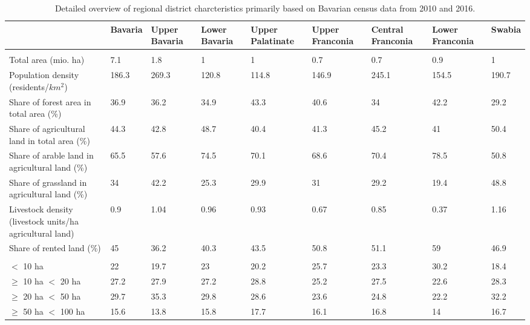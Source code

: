 \begin{table}

\caption{\label{tab:description_districts}Detailed overview of regional district charcteristics 
              primarily based on Bavarian census data from 2010 and 2016.}
\centering
\fontsize{10}{12}\selectfont
\begin{tabu} to 
\toprule
  & Bavaria & Upper
Bavaria & Lower
Bavaria & Upper
Palatinate & Upper
Franconia & Central
Franconia & Lower
Franconia & Swabia\\
\midrule
\addlinespace[0.3em]
\\
Total area (mio. ha) & 7.1 & 1.8 & 1 & 1 & 0.7 & 0.7 & 0.9 & 1\\
Population density (residents/$km^2$) & 186.3 & 269.3 & 120.8 & 114.8 & 146.9 & 245.1 & 154.5 & 190.7\\
Share of forest area in total area (\%) & 36.9 & 36.2 & 34.9 & 43.3 & 40.6 & 34 & 42.2 & 29.2\\
Share of agricultural land in total area (\%) & 44.3 & 42.8 & 48.7 & 40.4 & 41.3 & 45.2 & 41 & 50.4\\
Share of arable land in agricultural land (\%) & 65.5 & 57.6 & 74.5 & 70.1 & 68.6 & 70.4 & 78.5 & 50.8\\
Share of grassland in agricultural land (\%) & 34 & 42.2 & 25.3 & 29.9 & 31 & 29.2 & 19.4 & 48.8\\
Livestock density (livestock units/ha agricultural land) & 0.9 & 1.04 & 0.96 & 0.93 & 0.67 & 0.85 & 0.37 & 1.16\\
Share of rented land (\%) & 45 & 36.2 & 40.3 & 43.5 & 50.8 & 51.1 & 59 & 46.9\\
\addlinespace[0.3em]
\\
\hspace{1em}$<$ 10 ha & 22 & 19.7 & 23 & 20.2 & 25.7 & 23.3 & 30.2 & 18.4\\
\hspace{1em}$\geq$ 10 ha $<$ 20 ha & 27.2 & 27.9 & 27.2 & 28.8 & 25.2 & 27.5 & 22.6 & 28.3\\
\hspace{1em}$\geq$ 20 ha $<$ 50 ha & 29.7 & 35.3 & 29.8 & 28.6 & 23.6 & 24.8 & 22.2 & 32.2\\
\hspace{1em}$\geq$ 50 ha $<$ 100 ha & 15.6 & 13.8 & 15.8 & 17.7 & 16.1 & 16.8 & 14 & 16.7\\

\end{tabu}
\end{table}
